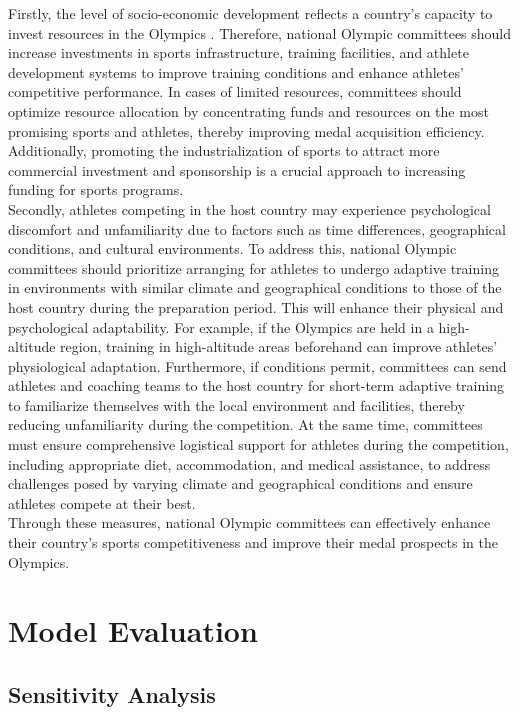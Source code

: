 \documentclass[12pt]{article}
\begin{document}
Firstly, the level of socio-economic development reflects a country's capacity to invest resources in the Olympics\cite{andreff2010economic} \cite{SCHLEMBACH2022121314}. Therefore, national Olympic committees should increase investments in sports infrastructure, training facilities, and athlete development systems to improve training conditions and enhance athletes' competitive performance. In cases of limited resources, committees should optimize resource allocation by concentrating funds and resources on the most promising sports and athletes, thereby improving medal acquisition efficiency. Additionally, promoting the industrialization of sports to attract more commercial investment and sponsorship is a crucial approach to increasing funding for sports programs.\\

Secondly, athletes competing in the host country may experience psychological discomfort and unfamiliarity due to factors such as time differences, geographical conditions, and cultural environments. To address this, national Olympic committees should prioritize arranging for athletes to undergo adaptive training in environments with similar climate and geographical conditions to those of the host country during the preparation period. This will enhance their physical and psychological adaptability. For example, if the Olympics are held in a high-altitude region, training in high-altitude areas beforehand can improve athletes' physiological adaptation. Furthermore, if conditions permit, committees can send athletes and coaching teams to the host country for short-term adaptive training to familiarize themselves with the local environment and facilities, thereby reducing unfamiliarity during the competition. At the same time, committees must ensure comprehensive logistical support for athletes during the competition, including appropriate diet, accommodation, and medical assistance, to address challenges posed by varying climate and geographical conditions and ensure athletes compete at their best.\\

Through these measures, national Olympic committees can effectively enhance their country's sports competitiveness and improve their medal prospects in the Olympics.

\section{Model Evaluation}
\subsection{Sensitivity Analysis}
\end{document}
